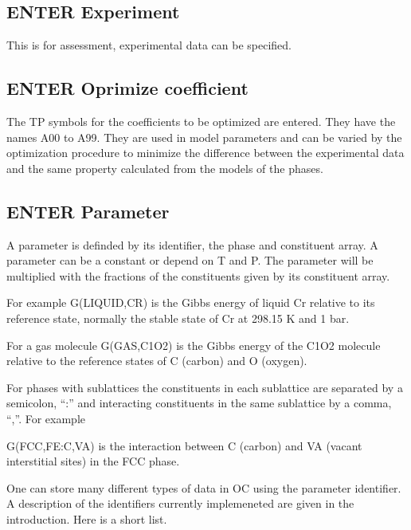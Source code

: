 \documentclass[12pt]{article}
\begin{document}
\subsection{ENTER Experiment}

This is for assessment, experimental data can be specified.

\subsection{ENTER Oprimize coefficient}

The TP symbols for the coefficients to be optimized are entered.  They
have the names A00 to A99.  They are used in model parameters and can
be varied by the optimization procedure to minimize the difference
between the experimental data and the same property calculated from
the models of the phases.

\subsection{ENTER Parameter}

A parameter is definded by its identifier, the phase and constituent
array.  A parameter can be a constant or depend on T and P.  The
parameter will be multiplied with the fractions of the constituents
given by its constituent array.

For example G(LIQUID,CR) is the Gibbs energy of liquid Cr relative to
its reference state, normally the stable state of Cr at 298.15 K and 1
bar.

For a gas molecule G(GAS,C1O2) is the Gibbs energy of the C1O2 molecule
relative to the reference states of C (carbon) and O (oxygen).

For phases with sublattices the constituents in each sublattice are
separated by a semicolon, ``:'' and interacting constituents in
the same sublattice by a comma, ``,''.  For example

G(FCC,FE:C,VA) is the interaction between C (carbon) and VA (vacant
interstitial sites) in the FCC phase.

One can store many different types of data in OC using the parameter
identifier.  A description of the identifiers currently implemeneted
are given in the introduction.  Here is a short list.
\end{document}

